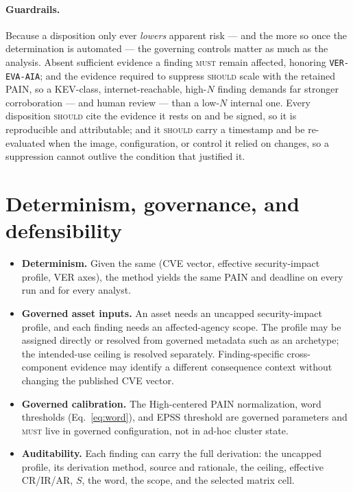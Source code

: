\documentclass[11pt]{article}
\newcommand{\code}[1]{\texttt{#1}}
\newcommand{\rfckw}[1]{\textsc{#1}}
\begin{document}
\paragraph{Guardrails.} Because a disposition only ever \emph{lowers} apparent risk ---
and the more so once the determination is automated --- the governing controls matter as
much as the analysis. Absent sufficient evidence a finding \rfckw{must} remain affected,
honoring \code{VER-EVA-AIA}; and the evidence required to suppress \rfckw{should} scale
with the retained PAIN, so a KEV-class, internet-reachable, high-$N$ finding demands far
stronger corroboration --- and human review --- than a low-$N$ internal one. Every
disposition \rfckw{should} cite the evidence it rests on and be signed, so it is
reproducible and attributable; and it \rfckw{should} carry a timestamp and be
re-evaluated when the image, configuration, or control it relied on changes, so a
suppression cannot outlive the condition that justified it.

\section{Determinism, governance, and defensibility}
\begin{itemize}[leftmargin=1.4em]
\item \textbf{Determinism.} Given the same (CVE vector, effective
  security-impact profile, VER axes), the method yields the same PAIN and deadline
  on every run and for every analyst.
\item \textbf{Governed asset inputs.} An asset needs an uncapped
  security-impact profile, and each finding needs an affected-agency scope. The
  profile may be assigned directly or resolved from governed metadata such as an
  archetype; the intended-use ceiling is resolved separately. Finding-specific
  cross-component evidence may identify a different consequence context without
  changing the published CVE vector.
\item \textbf{Governed calibration.} The High-centered PAIN normalization, word
  thresholds (Eq.~\eqref{eq:word}), and EPSS threshold are governed parameters and
  \rfckw{must} live in governed configuration, not in ad-hoc cluster state.
\item \textbf{Auditability.} Each finding can carry the full derivation: the
  uncapped profile, its derivation method, source and rationale, the ceiling,
  effective CR/IR/AR, $S$, the word, the scope, and the selected matrix cell.
\end{itemize}
\end{document}
